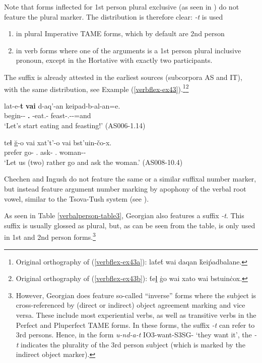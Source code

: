 Note that forms inflected for 1st person plural exclusive (as seen in ) do not feature the plural marker. The distribution is therefore clear: \textit{-t} is used
\begin{enumerate}
	\item in plural Imperative TAME forms, which by default are 2nd person
	\item in verb forms where one of the arguments is a 1st person plural inclusive pronoun, except in the Hortative with exactly two participants.
\end{enumerate}

The suffix is already attested in the earliest sources (subcorpora AS and IT), with the same distribution, see Example (\ref{verbflex-ex43}).\footnote{Original orthography of (\ref{verbflex-ex43a}): la\'{t}e\'{t} wai daqan \'{k}ei\'{p}adbalane.}\footnote{Original orthography of (\ref{verbflex-ex43b}): \'{t}eḽ \.{g}o wai xato wai bstuin\.{c}ox.}

\begin{exe}
	\ex\label{verbflex-ex43}
	\begin{xlist}
		
		
		\ex\label{verbflex-ex43a}
		\gll lat-e-\textbf{t} \textbf{vai} d-aq'-an keipad-b-al-an=e. \\
		begin-{\Npst}-\textbf{{\Pl}} \textbf{{\Fpl}.{\Incl}} {\D}-eat.{\Pfv}-{\Inf} feast-{\M}.{\Pl}-{\Intr}-{\Inf}=and\\
		\trans `Let's start eating and feasting!'
		\hfill (AS006-1.14)
		
		
		
		\ex\label{verbflex-ex43b}
		\gll teɬ \u{g}-o vai xat't'-o vai bst'uin-čo-x.  \\
		prefer go-{\Npst} {\Fpl}.{\Incl} ask-{\Npst} {\Fpl}.{\Incl} woman-{\Obl}-{\Cont}\\
		\trans `Let us (two) rather go and ask the woman.'
		\hfill (AS008-10.4)
		
		
	\end{xlist}
\end{exe}


Chechen and Ingush do not feature the same or a similar suffixal number marker, but instead feature argument number marking by apophony of the verbal root vowel, similar to the Tsova-Tush system (see ).

As seen in Table \ref{verbalperson-table3}, Georgian also features a suffix \textit{-t}. This suffix is usually glossed as plural, but, as can be seen from the table, is only used in 1st and 2nd person forms.\footnote{However, Georgian does feature so-called ``inverse'' forms where the subject is cross-referenced by (direct or indirect) object agreement marking and vice versa. These include most experiential verbs, as well as transitive verbs in the Perfect and Pluperfect TAME forms. In these forms, the suffix \textit{-t} can refer to 3rd persons. Hence, in the form \textit{u-nd-a-t} \textsc{IO3}-want-\textsc{S3SG-{\Pl}} `they want it', the \textit{-t} indicates the plurality of the 3rd person subject (which is marked by the indirect object marker).}


